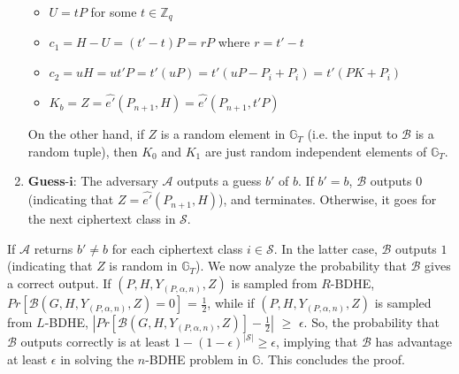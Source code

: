\begin{enumerate}
 \begin{itemize}
  \item $U=tP$ for some $t\in\mathbb{Z}_q$
  \item $c_1=H-U=(t'-t)P=rP$ where $r=t'-t$
  \item $c_2=uH=ut'P=t'(uP)=t'(uP-{P_i}+P_i)=t'(PK+P_i)$
  \item $K_b=Z=\hat{e'}(P_{n+1},H)=\hat{e'}(P_{n+1},t'P)$
 \end{itemize}
 On the other hand, if $Z$ is a random element in $\mathbb{G}_T$ (i.e. the input to $\mathcal{B}$ is a random tuple), then $K_0$ and $K_1$ are just random independent elements of $\mathbb{G}_T$.
 
 \item\textbf{Guess}-$\mathbf{i}$: The adversary $\mathcal{A}$ outputs a guess $b'$ of $b$. If $b' = b$, $\mathcal{B}$ outputs $0$ (indicating that $Z = \hat{e'}(P_{n+1},H)$), and terminates. Otherwise, it goes for the next ciphertext class in $\mathcal{S}$.
\end{enumerate}

If $\mathcal{A}$ returns $b' \neq b$ for each ciphertext class $i\in\mathcal{S}$. In the latter case, $\mathcal{B}$ outputs $1$ (indicating that $Z$ is random in $\mathbb{G}_T$). We now analyze the probability that $\mathcal{B}$ gives a correct output. If $(P,H,Y_{(P,\alpha,n)},Z)$ is sampled from $R$-BDHE, $Pr[\mathcal{B}(G,H,Y_{(P,\alpha,n)},Z)=0]$ = $\frac{1}{2}$, while if $(P,H,Y_{(P,\alpha,n)},Z)$ is sampled from $L$-BDHE, $|Pr[\mathcal{B}(G,H,Y_{(P,\alpha,n)},Z)]-\frac{1}{2}|$ $\geq$ $\epsilon$. So, the probability that $\mathcal{B}$ outputs correctly is at least $1-(1-\epsilon)^{|\mathcal{S}|} \geq \epsilon$, implying that $\mathcal{B}$ has advantage at least $\epsilon$ in solving the $n$-BDHE problem in $\mathbb{G}$. This concludes the proof.
  



